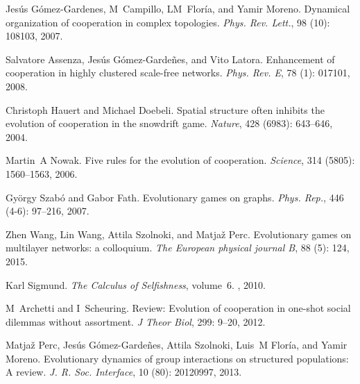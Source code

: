 Jes{\'u}s {G{\'o}mez-Gardenes}, M~Campillo, LM~Flor{\'i}a, and Yamir Moreno.
\newblock Dynamical organization of cooperation in complex topologies.
\newblock \emph{Phys. Rev. Lett.}, 98 (10): 108103, 2007.

Salvatore Assenza, Jes{\'u}s {G{\'o}mez-Garde{\~n}es}, and Vito Latora.
\newblock Enhancement of cooperation in highly clustered scale-free networks.
\newblock \emph{Phys. Rev. E}, 78 (1): 017101, 2008.

Christoph Hauert and Michael Doebeli.
\newblock Spatial structure often inhibits the evolution of cooperation in the
snowdrift game.
\newblock \emph{Nature}, 428 (6983): 643--646, 2004.

Martin~A Nowak.
\newblock Five rules for the evolution of cooperation.
\newblock \emph{Science}, 314 (5805): 1560--1563, 2006.

Gy{\"o}rgy Szab{\'o} and Gabor Fath.
\newblock Evolutionary games on graphs.
\newblock \emph{Phys. Rep.}, 446 (4-6): 97--216, 2007.

Zhen Wang, Lin Wang, Attila Szolnoki, and Matja{\v{z}} Perc.
\newblock Evolutionary games on multilayer networks: a colloquium.
\newblock \emph{The European physical journal B}, 88 (5):
124, 2015{}.

Karl Sigmund.
\newblock \emph{The Calculus of Selfishness}, volume~6.
, 2010.

M~Archetti and I~Scheuring.
\newblock Review: {{Evolution}} of cooperation in one-shot social dilemmas
without assortment.
\newblock \emph{J Theor Biol}, 299: 9--20, 2012.

Matja{\v z} Perc, Jes{\'u}s {G{\'o}mez-Garde{\~n}es}, Attila Szolnoki, Luis~M
Flor{\'i}a, and Yamir Moreno.
\newblock Evolutionary dynamics of group interactions on structured
populations: A review.
\newblock \emph{J. R. Soc. Interface}, 10 (80): 20120997,
2013.

